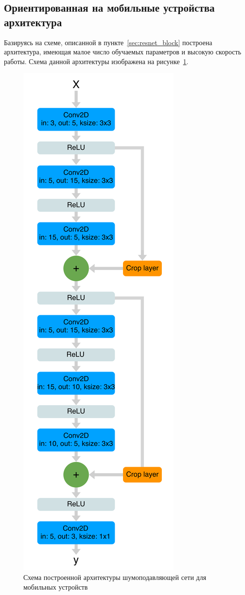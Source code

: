 \documentclass[14pt]{mmcs_article}
\begin{document}
\subsection{Ориентированная на мобильные устройства архитектура}

Базируясь на схеме, описанной в пункте~\ref{sec:resnet_block} построена архитектура, имеющая малое число обучаемых параметров и высокую скорость работы. Схема данной архитектуры изображена на рисунке~\ref{fig:simple_net_architecture}.

\begin{figure}[H]
	\centering
	\includegraphics[scale=0.07]{img/simple_net_architecture}
	\caption{Схема построенной архитектуры шумоподавляющей сети для мобильных устройств} 
	\label{fig:simple_net_architecture}
\end{figure}
\end{document}
